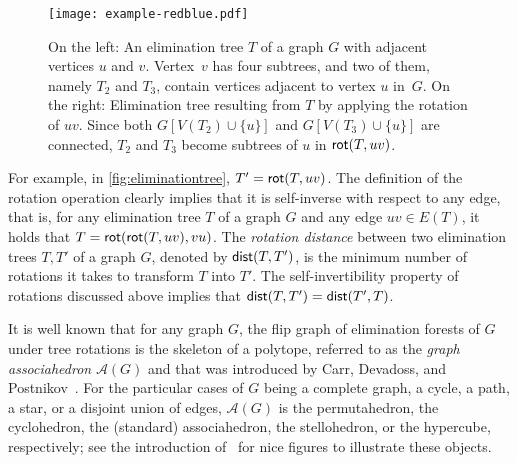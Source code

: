 \documentclass[a4paper,UKenglish,cleveref, autoref, thm-restate]{lipics-v2021}
\newcommand{\rot}{{\sf rot}\xspace}
\newcommand{\dist}{{\sf dist}\xspace}
\begin{document}
\begin{figure}[h!tb]
    \centering
    \vspace{-.15cm}
    \texttt{[image: example-redblue.pdf]}
    \caption{
    On the left:
    An elimination tree $T$ of a graph $G$ with adjacent vertices $u$ and $v$. Vertex~$v$ has four subtrees, and two of them, namely $T_2$ and $T_3$, contain vertices adjacent to vertex $u$ in~$G$.
    On the right:
    Elimination tree resulting from $T$ by applying the rotation of $uv$.
    Since both $G[V(T_2) \cup \{u\}]$ and $G[V(T_3) \cup \{u\}]$ are connected, $T_2$ and $T_3$ become subtrees of $u$ in $\rot(T,uv)$.
    \label{fig:rotation1}}
\end{figure}



For example, in \autoref{fig:eliminationtree}, $T'=\rot(T,uv)$. The definition of the rotation operation clearly implies that it is self-inverse with respect to any edge, that is, for any elimination tree $T$ of a graph $G$ and any edge $uv \in E(T)$, it holds that $T= \rot(\rot(T,uv),vu)$. The \emph{rotation distance} between two elimination trees $T,T'$ of a graph $G$, denoted by $\dist(T,T')$, is the minimum number of rotations it takes to transform $T$ into $T'$. The self-invertibility property of rotations discussed above implies that  $\dist(T,T') = \dist(T',T)$.








It is well known that for any graph $G$, the flip graph of elimination forests of $G$ under tree rotations is the skeleton of a polytope, referred to as the \emph{graph associahedron} ${\mathcal A}(G)$ and that was introduced by Carr, Devadoss, and Postnikov~\cite{Devadoss09,CarrD06,Postnikov09}. For the particular cases of $G$ being a complete graph, a cycle, a path,   a star, or a disjoint union of edges, ${\mathcal A}(G)$ is the permutahedron, the cyclohedron, the (standard) associahedron,  the stellohedron, or the hypercube, respectively; see the introduction of~\cite{cardinal2022efficient} for nice figures to illustrate these objects.
\end{document}
